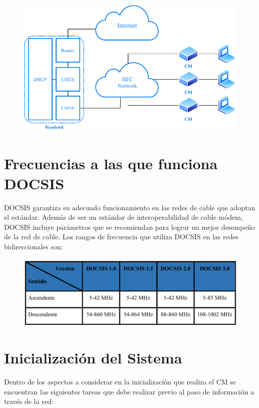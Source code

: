 \begin{figure}[ht!]
\centering
\includegraphics[scale=0.66]{Imagenes/docsis.pdf}
\end{figure}



\section*{Frecuencias a las que funciona DOCSIS}
DOCSIS garantiza su adecuado funcionamiento en las redes de cable que adoptan el estándar. Además de ser un estándar de interoperabilidad de cable módem, DOCSIS incluye parámetros que se recomiendan para lograr un mejor desempeño de la red de cable. Los rangos de frecuencia que utiliza DOCSIS en las redes bidireccionales son:

\begin{figure}[ht!]
\centering
\includegraphics[scale=0.66]{Imagenes/tablaDOCSIS.png}
\end{figure}

\section*{Inicialización del Sistema}
Dentro de los aspectos a considerar en la inicialización que realiza el CM se encuentran las siguientes tareas que debe realizar previo al paso de información a través de la red:

